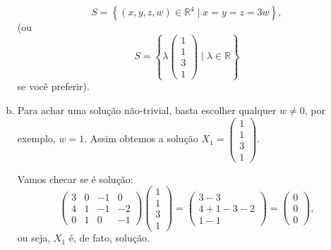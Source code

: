\documentclass[a4paper,10pt]{article}
\def\R{\mathbb R}
\newenvironment{sol}{\begin{tcolorbox}[breakable,colback=blue!5!white,colframe=blue!40!white,title=\normalsize {\sc{Solução}},coltitle=black]}{\end{tcolorbox}}
\begin{document}
\begin{sol}
\begin{enumerate}[a)]
		\[S=\left\{(x,y,z,w)\in\R^4\mid x=y=z=3w\right\},\] (ou
		\[S=\left\{\lambda \begin{pmatrix}
		1\\1\\3\\1
		\end{pmatrix}\mid \lambda\in \R \right\}\]se você preferir).
		\item Para achar uma solução não-trivial, basta escolher qualquer $w\neq 0$, por exemplo, $w=1$. Assim obtemos a solução $X_1=\begin{pmatrix}
		1\\1\\3\\1
		\end{pmatrix}$.
		
		Vamos checar se é solução:
		\[
		\begin{pmatrix}
		3&0&-1&0\\4&1&-1&-2\\0&1&0&-1
		\end{pmatrix}\begin{pmatrix}
		1\\1\\3\\1
		\end{pmatrix}=\begin{pmatrix}
		3-3 \\ 4+1-3-2 \\ 1-1
		\end{pmatrix}=\begin{pmatrix}
		0\\0\\0
		\end{pmatrix},\] ou seja, $X_1$ é, de fato, solução.
	\end{enumerate}
\end{sol}\pagebreak
\end{document}
